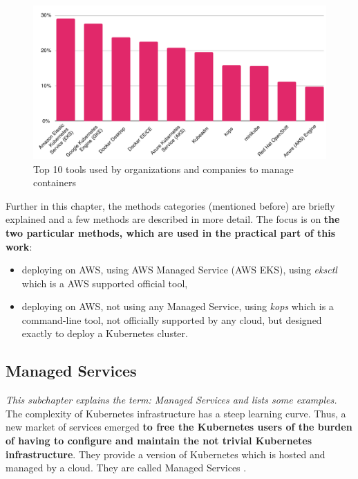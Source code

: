 \begin{figure}[H]
    \centering
    \includegraphics[width=16cm]{figures/cncf-2019-cont-tools.png}
    \captionsetup{justification=centering,margin=2cm}
    \caption{Top 10 tools used by organizations and companies to manage containers \cite{cncf-2019}}
    \label{fig:cncf2019}
\end{figure}

Further in this chapter, the methods categories (mentioned before) are briefly explained and a few methods are described in more detail. The focus is on \textbf{the two particular methods, which are used in the practical part of this work}:
\begin{itemize}
\item deploying on AWS, using AWS Managed Service (AWS EKS), using \textit{eksctl} which is a AWS supported official tool,
\item deploying on AWS, not using any Managed Service, using \textit{kops} which is a command-line tool, not officially supported by any cloud, but designed exactly to deploy a Kubernetes cluster.
\end{itemize}

\subsection{Managed Services}
\textit{This subchapter explains the term: Managed Services and lists some examples.}
\\

The complexity of Kubernetes infrastructure has a steep learning curve. Thus, a new market of services emerged \textbf{to free the Kubernetes users of the burden of having to configure and maintain the not trivial Kubernetes infrastructure}. They provide a version of Kubernetes which is hosted and managed by a cloud. They are called Managed Services \cite{article-managed}.

